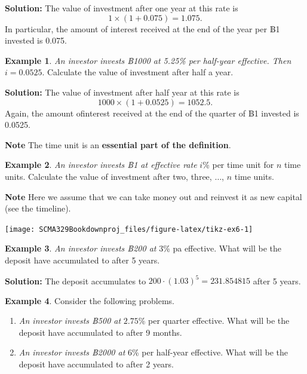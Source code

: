 \documentclass[
]{book}
\theoremstyle{definition}
\theoremstyle{definition}
\newtheorem{example}{Example}[chapter]
\theoremstyle{definition}
\theoremstyle{definition}
\theoremstyle{remark}
\begin{document}
\textbf{Solution:} The value of investment after one year at this rate is
\[1 \times ( 1 + 0.075) = 1.075.\]
In particular, the amount of
interest received at the end of the year per ฿1 invested is 0.075.

\begin{example}
\emph{An investor invests ฿1000 at 5.25\% per half-year effective. Then}
\(i = 0.0525\). Calculate the value of investment after half a year.
\end{example}

\textbf{Solution:} The value of investment after half year at this rate is
\[1000 \times ( 1 + 0.0525) = 1052.5.\]
Again, the amount ofinterest received at the end of the quarter of ฿1 invested is 0.0525.

\textbf{Note} The time unit is an \textbf{essential part of the definition}.

\begin{example}
\emph{An investor invests ฿1 at effective rate} \(i\)\% per time unit for \(n\)
time units. Calculate the value of investment after two, three,
\(\ldots\), \(n\) time units.
\end{example}

\textbf{Note} Here we assume that we can take money out and reinvest it as
new capital (see the timeline).

\begin{center}\texttt{[image: SCMA329Bookdownproj\_files/figure-latex/tikz-ex6-1]} \end{center}

\begin{example}
\emph{An investor invests ฿200 at} \(3\)\% pa effective. What will be the
deposit have accumulated to after 5 years.
\end{example}

\textbf{Solution:} The deposit accumulates to
\(200 \cdot (1.03)^5 = 231.854815\) after 5 years.

\begin{example}

Consider the following problems.

\begin{enumerate}
\def\labelenumi{\arabic{enumi}.}
\item
  \emph{An investor invests ฿500 at} \(2.75\)\% per quarter effective. What
  will be the deposit have accumulated to after 9 months.
\item
  \emph{An investor invests ฿2000 at} \(6\)\% per half-year effective. What
  will be the deposit have accumulated to after 2 years.
\end{enumerate}

\end{example}
\end{document}
